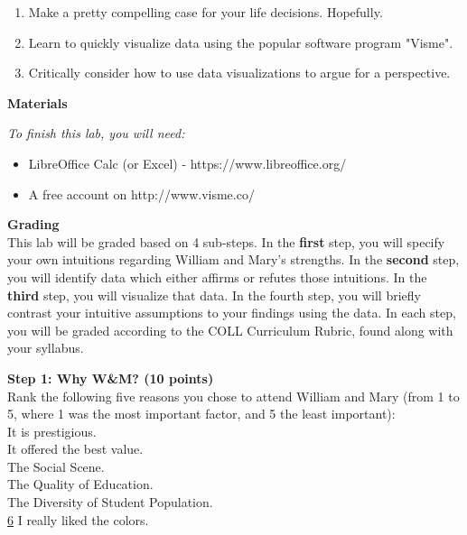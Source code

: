 \documentclass{article}
\begin{document}
\begin{enumerate}[leftmargin=15mm]

\item Make a pretty compelling case for your life decisions.  Hopefully.
\item Learn to quickly visualize data using the popular software program "Visme". 
\item Critically consider how to use data visualizations to argue for a perspective.

\end{enumerate}

\vspace{3mm}
\textbf{Materials}

\textit{To finish this lab, you will need:}
\begin{itemize}
\item LibreOffice Calc (or Excel) - https://www.libreoffice.org/
\item A free account on http://www.visme.co/
\end{itemize}

\vspace{3mm}
\textbf{Grading}\\
This lab will be graded based on 4 sub-steps.  In the \textbf{first} step, you will specify your own intuitions regarding William and Mary's strengths.  In the \textbf{second} step, you will identify data which either affirms or refutes those intuitions.  In the \textbf{third} step, you will visualize that data.  In the fourth step, you will briefly contrast your intuitive assumptions to your findings using the data.  In each step, you will be graded according to the COLL Curriculum Rubric, found along with your syllabus.

\vspace{3mm}
\textbf{Step 1: Why W\&M? (10 points)}\\
Rank the following five reasons you chose to attend William and Mary (from 1 to 5, where 1 was the most important factor, and 5 the least important):\\
\underline{\hspace{0.35cm}} It is prestigious.\\
\underline{\hspace{0.35cm}} It offered the best value.\\
\underline{\hspace{0.35cm}} The Social Scene. \\
\underline{\hspace{0.35cm}} The Quality of Education. \\
\underline{\hspace{0.35cm}} The Diversity of Student Population.\\
\underline{\hspace{0.05cm}}\underline{6}\underline{\hspace{0.1cm}}  I really liked the colors.\\
\end{document}
